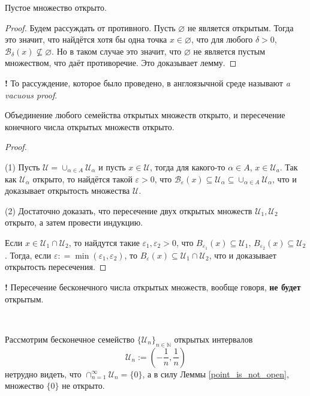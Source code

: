 \begin{lemma}\label{empty_is_open}
    Пустое множество открыто.
\end{lemma}

\begin{proof}
Будем рассуждать от противного. Пусть $\varnothing$ не является открытым. Тогда это значит, что найдётся хотя бы одна точка $x \in \varnothing$, что для любого $\delta >0$, $\mathscr{B}_\delta(x) \not\subseteq \varnothing$. Но в таком случае это значит, что $\varnothing$ не является пустым множеством, что даёт противоречие. Это доказывает лемму.
\end{proof}

\begin{mydanger}{\bf !}
    То рассуждение, которое было проведено, в англоязычной среде называют \textit{a vacuous proof}. 
\end{mydanger}


\begin{lemma}\label{union_and_cap_of_open}
    Объединение любого семейства открытых множеств открыто, и пересечение конечного числа открытых множеств открыто. 
\end{lemma}
\begin{proof}\
 
(1) Пусть $\mathscr{U} = \cup_{\alpha \in A}\mathscr{U}_\alpha$ и пусть $x \in \mathscr{U}$, тогда для какого-то $\alpha \in A$, $x \in \mathscr{U}_a$. Так как $\mathscr{U}_\alpha$ открыто, то найдётся такой $\varepsilon >0$, что $\mathscr{B}_\varepsilon(x) \subseteq \mathscr{U}_\alpha \subseteq \cup_{\alpha \in A}\mathscr{U}_\alpha$, что и доказывает открытость множества $\mathscr{U}.$

(2) Достаточно доказать, что пересечение двух открытых множеств $\mathscr{U}_1, \mathscr{U}_2$ открыто, а затем провести индукцию.

Если $x \in \mathscr{U}_1 \cap \mathscr{U}_2$, то найдутся такие $\varepsilon_1, \varepsilon_2 >0$, что $B_{\varepsilon_1}(x) \subseteq \mathscr{U}_1$, $B_{\varepsilon_2}(x) \subseteq \mathscr{U}_2$. Тогда, если $\varepsilon: = \min(\varepsilon_1,\varepsilon_2)$, то $B_\varepsilon(x) \subseteq \mathscr{U}_1 \cap \mathscr{U}_2$, что и доказывает открытость пересечения.
\end{proof}

\begin{mydanger}{\bf !}
    Пересечение бесконечного числа открытых множеств, вообще говоря, \textbf{не будет} открытым.
\end{mydanger}
~
\begin{example}
    Рассмотрим бесконечное семейство $\{\mathscr{U}_n\}_{n \in \mathbb{N}}$ открытых интервалов 
    \[
     \mathscr{U}_n:= \left( -\frac{1}{n}, \frac{1}{n}\right)
    \]
нетрудно видеть, что $\cap_{n=1}^\infty \mathscr{U}_n = \{0\}$, а в силу Леммы \ref{point_is_not_open}, множество $\{0\}$ не открыто.  
\end{example}


